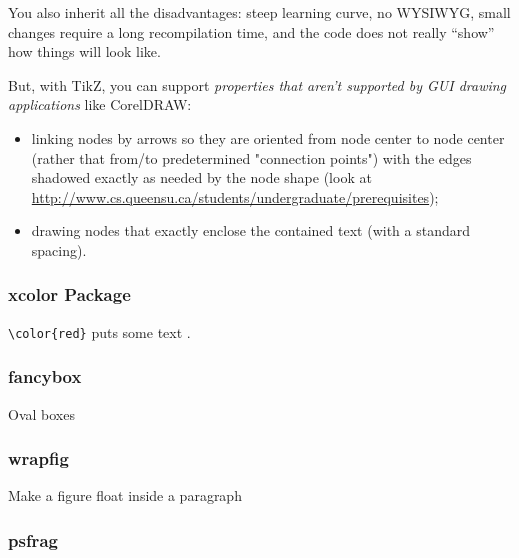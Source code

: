 \documentclass{boostreport}
\begin{document}
You also inherit all the disadvantages: steep learning curve, no
\acs{WYSIWYG}, small changes require a long recompilation time, and the code
does not really ``show'' how things will look like.

But, with TikZ, you can support \emph{properties that aren't supported by
GUI drawing applications} like CorelDRAW:

\begin{itemize}
    \item linking nodes by arrows so they are oriented from node center to
    node center (rather that from/to predetermined "connection points") with
    the edges shadowed exactly as needed by the node shape (look at
    \href{http://www.cs.queensu.ca/students/undergraduate/prerequisites}
    {http://www.cs.queensu.ca/students/undergraduate/prerequisites});

    \item drawing nodes that exactly enclose the contained text (with a
    standard spacing).
\end{itemize}

\subsubsection{xcolor Package}

\verb|\color{red}| puts some text \color{red}{in red}\color{black}.

\subsubsection{fancybox}

Oval boxes

\subsubsection{wrapfig}

Make a figure float inside a paragraph

\subsubsection{psfrag}


\end{document}
